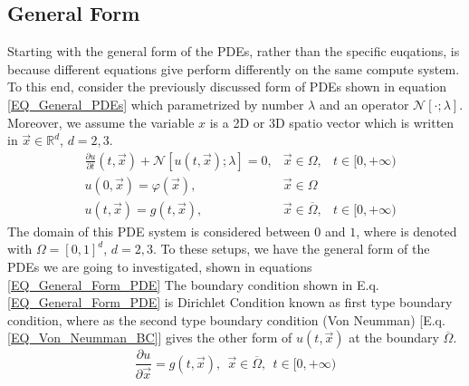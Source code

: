 \subsection{General Form}\label{SEC_General_Form}
Starting with the general form of the PDEs, rather than the specific euqations, is because 
different equations give perform differently on the same compute system.
To this end, consider the previously discussed form of PDEs shown in 
equation \ref{EQ_General_PDEs} which parametrized by number $\lambda$ and an operator $\mathcal{N}[\cdot; \lambda]$.
Moreover, we assume the variable $x$ is a 2D or 3D spatio vector which is written in 
$\vec{x} \in \mathbb{R}^d$, $d = 2, 3$.
\begin{align}\label{EQ_General_Form_PDE}
  &\frac{\partial u}{\partial t}\left(t,\vec{x}\right) + \mathcal{N}\left[u(t,\vec{x});\lambda\right] = 0, &\vec{x}\in\Omega, &t\in[0, +\infty) \nonumber\\
  &u\left(0,\vec{x}\right) = \varphi (\vec{x}), &\vec{x}\in\Omega & \\
  &u\left(t,\vec{x}\right) = g (t,\vec{x}),     &\vec{x}\in \overline{\Omega}, &t\in[0, +\infty) \nonumber
\end{align}
The domain of this PDE system is considered between $0$ and $1$, where is denoted with $\Omega = [0, 1]^d$, $d = 2,3$.
To these setups, we have the general form of the PDEs we are going to investigated, shown in equations \ref{EQ_General_Form_PDE}
The boundary condition shown in E.q. \ref{EQ_General_Form_PDE} is Dirichlet Condition known as first type boundary condition, where as the 
second type boundary condition (Von Neumman) [E.q. \ref{EQ_Von_Neumman_BC}] gives the other form of $u(t,\vec{x})$ at the boundary $\overline{\Omega}$.
\begin{equation}\label{EQ_Von_Neumman_BC}
  \frac{\partial u}{\partial \vec{x}} = g(t, \vec{x}),\:\: \vec{x}\in \overline{\Omega}, \:\:t\in[0, +\infty)
\end{equation}

